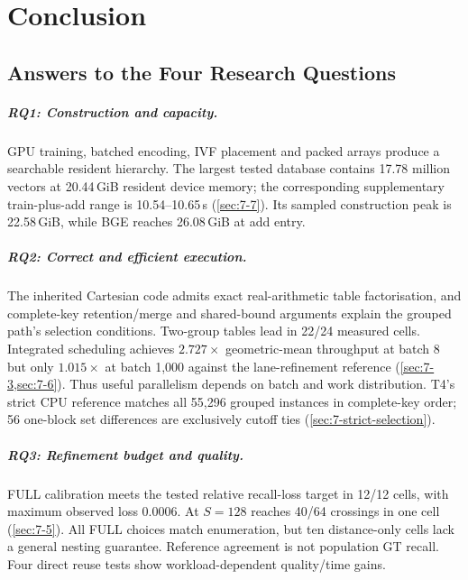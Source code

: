 \chapter{Conclusion}
\label{ch:conclusion}

\section{Answers to the Four Research Questions}
\label{sec:9-1}
\paragraph{RQ1: Construction and capacity.}
GPU training, batched encoding, IVF placement and packed arrays produce a
searchable resident hierarchy. The largest tested database contains
17.78 million vectors at 20.44\,GiB resident device memory; the corresponding
supplementary train-plus-add range is 10.54--10.65\,s
(\cref{sec:7-7}). Its sampled construction peak is 22.58\,GiB, while
BGE reaches 26.08\,GiB at add entry.

\paragraph{RQ2: Correct and efficient execution.}
The inherited Cartesian code admits exact real-arithmetic table
factorisation, and complete-key retention/merge and shared-bound arguments
explain the grouped path's selection conditions. Two-group tables lead in
22/24 measured cells. Integrated scheduling achieves $2.727\times$
geometric-mean throughput at batch 8 but only $1.015\times$ at batch 1,000
against the lane-refinement reference (\cref{sec:7-3,sec:7-6}). Thus useful
parallelism depends on batch and work distribution. T4's strict CPU
reference matches all 55,296 grouped instances in complete-key order;
56 one-block set differences are exclusively cutoff ties
(\cref{sec:7-strict-selection}).

\paragraph{RQ3: Refinement budget and quality.}
FULL calibration meets the tested relative
recall-loss target in 12/12 cells, with maximum observed loss 0.0006.
At $S=128$ reaches 40/64 crossings in one cell (\cref{sec:7-5}). All FULL choices match enumeration, but ten distance-only cells lack a general nesting guarantee. Reference agreement is not population GT recall. Four direct reuse tests show workload-dependent quality/time gains.

